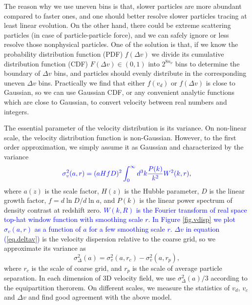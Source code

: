 \documentclass[10pt,twocolumn,preprint]{emulateapj}
\newcommand{\tcb}{\textcolor{blue}}
\begin{document}
The reason why we use uneven bins is that, slower particles are more abundant compared to faster ones, and one should better resolve slower particles tracing at least linear evolution. On the other hand, there could be extreme scattering particles (in case of particle-particle force), and we can safely ignore or less resolve those nonphysical particles. One of the solution is that, if we know the probability distribution function (PDF) $f(\Delta v)$ we divide its cumulative distribution function (CDF) $F(\Delta v)\in(0,1)$ into $2^{8n_\nu}$ bins to determine the boundary of $\Delta v$ bins, and particles should evenly distribute in the corresponding uneven $\Delta v$ bins. Practically we find that either $f(v_d)$ or $f(\Delta v)$ is close to Gaussian, so we can use Gaussian CDF, or any convenient analytic functions which are close to Gaussian, to convert velocity between real numbers and integers.

The essential parameter of the velocity distribution is its variance. On non-linear scale, the velocity distribution function is non-Gaussian. However, to the first order approximation, we simply assume it as Gaussian and characterized by the variance
\begin{equation}\label{eq.vdisp}
	\tcb{\sigma^2_v(a,r) = (a H f D)^2 \int_0^\infty d^3k\frac{P(k)}{k^2}W^2(k,r)},
\end{equation}
where $a(z)$ is the scale factor, $H(z)$ is the Hubble parameter, $D$ is the linear growth factor, $f=d \ln D/d\ln a$, and $P(k)$ is the linear power spectrum of density contrast at redshift zero. \tcb{$W(k,R)$ is the Fourier transform of real space top-hat window function with smoothing scale $r$. In Figure \ref{fig.vdisp} we plot $\sigma_v(a,r)$ as a function of $a$ for a few smoothing scale $r$. $\Delta v$ in equation (\ref{eq.deltav})} is the velocity dispersion relative to the coarse grid, so we approximate its variance as
\begin{equation}\label{eq.vdelta}
	\sigma^2_{\Delta}(a)=\sigma^2_v(a,r_c)-\sigma^2_v(a,r_p),
\end{equation}
where $r_c$ is the scale of coarse grid, and $r_p$ is the scale of average particle separation. In each dimension of 3D velocity field, we use $\sigma^2_{\Delta}(a)/3$ according to the equipartition therorem. On different scales, we measure the statistics of $v_d$, $v_c$ and $\Delta v$ and find good agreement with the above model.
\end{document}
